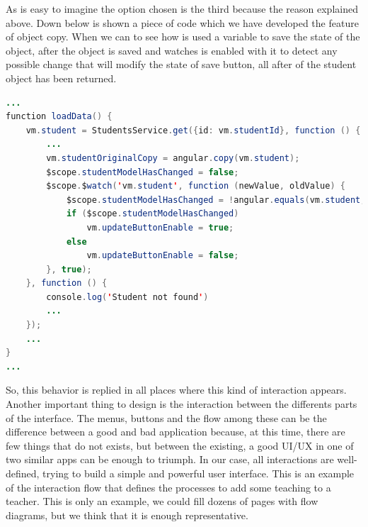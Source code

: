\noindent As is easy to imagine the option chosen is the third because the reason explained
above. Down below is shown a piece of code which we have developed the feature of object copy.
When we can to see how is used a variable to save the state of the object, after
the object is saved and watches is enabled with it to detect any possible change
that will modify the state of save button, all after of the student object has been returned.

\begin{lstlisting}[language=java,frame=none, title=studentProfile.js]
...
function loadData() {
    vm.student = StudentsService.get({id: vm.studentId}, function () {
        ...
        vm.studentOriginalCopy = angular.copy(vm.student);
        $scope.studentModelHasChanged = false;
        $scope.$watch('vm.student', function (newValue, oldValue) {
            $scope.studentModelHasChanged = !angular.equals(vm.student, vm.studentOriginalCopy);
            if ($scope.studentModelHasChanged)
                vm.updateButtonEnable = true;
            else
                vm.updateButtonEnable = false;
        }, true);
    }, function () {
        console.log('Student not found')
        ...
    });
    ...
}
...
\end{lstlisting}

\noindent So, this behavior is replied in all places where this kind of interaction appears.
\intro
Another important thing to design is the interaction between the differents parts
of the interface. The menus, buttons and the flow among these can be the difference
between a good and bad application because, at this time, there are few things
that do not exists, but between the existing, a good UI/UX in one of two similar
apps can be enough to triumph.
\intro
In our case, all interactions are well-defined, trying to build a simple and
powerful user interface. This is an example of the interaction flow that defines
the processes to add some teaching to a teacher.
This is only an example, we could fill dozens of pages with flow diagrams, but
we think that it is enough representative.




%

